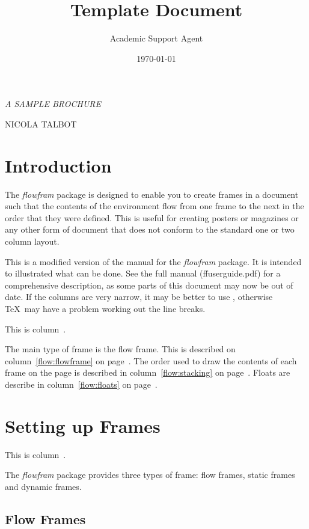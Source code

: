 \documentclass{article}
\title{Template Document}
\author{Academic Support Agent}
\date{\today}
\begin{document}
\maketitle


{\noindent
\slshape\Huge\MakeUppercase{A Sample Brochure}\par
\vskip0.5in
\noindent\large\MakeUppercase{Nicola Talbot}\\
}

\chapter{Introduction}

The \textsl{flowfram} package is designed to enable you to create
frames in a document such that the
contents of the  environment flow from one
frame to the next in the order that they were defined.
This is useful for creating posters
or magazines or any other form of document that does not
conform to the standard one or two column layout.

This is a modified version of the manual for the \textsl{flowfram} package.
It is intended to illustrated what can be done. See the full
manual (ffuserguide.pdf) for
a comprehensive description, as some parts of this document
may now be out of date.
If the columns are very narrow, it may be better to
use , otherwise \TeX\ may have a
problem working out the line breaks.

This is column~\thedisplayedframe.

The main type of frame is the flow frame. This is described on
column~\ref{flow:flowframe} on page~\pageref{flow:flowframe}.
The order used to draw the contents of each frame on the page
is described in column~\ref{flow:stacking} on
page~\pageref{flow:stacking}. Floats are describe in
column~\ref{flow:floats} on page~\pageref{flow:floats}.

\chapter{Setting up Frames}

This is column~\thedisplayedframe.

The \textsl{flowfram} package provides three types of frame:
{flow frames}, {static
frames} and {dynamic frames}.

\section*{Flow Frames}
\end{document}
